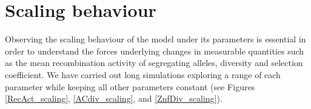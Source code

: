 \documentclass[a4paper,10pt]{article}
\begin{document}


\section{Scaling behaviour}



Observing the scaling behaviour of the model under its parameters is essential in order to understand the forces underlying changes in measurable quantities such as the mean recombination activity of segregating alleles, diversity and selection coefficient. We have carried out long simulations exploring a range of each parameter while keeping all other parameters constant (see Figures \ref{RecAct_scaling}, \ref{ACdiv_scaling}, and \ref{ZnfDiv_scaling}).
\end{document}
